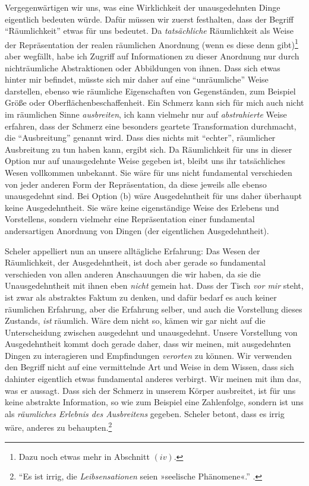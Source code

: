 \documentclass[a4paper, 12pt]{article}
\begin{document}
\begin{onehalfspace}
Vergegenwärtigen wir uns, was eine Wirklichkeit der unausgedehnten Dinge eigentlich bedeuten würde. Dafür müssen wir zuerst festhalten, dass der Begriff "`Räumlichkeit"' etwas für uns bedeutet. Da \emph{tatsächliche} Räumlichkeit als Weise der Repräsentation der realen räumlichen Anordnung (wenn es diese denn gibt)\footnote{Dazu noch etwas mehr in Abschnitt $(iv)$.} aber wegfällt, habe ich Zugriff auf Informationen zu dieser Anordnung nur durch nichträumliche Abstraktionen oder Abbildungen von ihnen. Dass sich etwas hinter mir befindet, müsste sich mir daher auf eine "`unräumliche"' Weise darstellen, ebenso wie räumliche Eigenschaften von Gegenständen, zum Beispiel Größe oder Oberflächen\-be\-schaf\-fenheit. Ein Schmerz kann sich für mich auch nicht im räumlichen Sinne \emph{ausbreiten}, ich kann vielmehr nur auf \emph{abstrahierte} Weise erfahren, dass der Schmerz eine besonders geartete Transformation durchmacht, die "`Ausbreitung"' genannt wird. Dass dies nichts mit "`echter"', räumlicher Ausbreitung zu tun haben kann, ergibt sich. Da Räumlichkeit für uns in dieser Option nur auf unausgedehnte Weise gegeben ist, bleibt uns ihr tatsächliches Wesen vollkommen unbekannt. Sie wäre für uns nicht fundamental verschieden von jeder anderen Form der Repräsentation, da diese jeweils alle ebenso unausgedehnt sind. Bei Option (b) wäre Ausgedehntheit für uns daher überhaupt keine Ausgedehntheit. Sie wäre keine eigenständige Weise des Erlebens und Vorstellens, sondern vielmehr eine Repräsentation einer fundamental andersartigen Anordnung von Dingen (der eigentlichen Ausgedehntheit).

Scheler appelliert nun an unsere alltägliche Erfahrung: Das Wesen der Räumlichkeit, der Ausgedehntheit, ist doch aber gerade so fundamental verschieden von allen anderen Anschauungen die wir haben, da sie die Unausgedehntheit mit ihnen eben \emph{nicht} gemein hat. Dass der Tisch \emph{vor mir} steht, ist zwar als abstraktes Faktum zu denken, und dafür bedarf es auch keiner räumlichen Erfahrung, aber die Erfahrung selber, und auch die Vorstellung dieses Zustands, \emph{ist} räumlich. Wäre dem nicht so, kämen wir gar nicht auf die Unterscheidung zwischen ausgedehnt und unausgedehnt. Unsere Vorstellung von Ausgedehntheit kommt doch gerade daher, dass wir meinen, mit ausgedehnten Dingen zu interagieren und Empfindungen \emph{verorten} zu können. Wir verwenden den Begriff nicht auf eine vermittelnde Art und Weise in dem Wissen, dass sich dahinter eigentlich etwas fundamental anderes verbirgt. Wir meinen mit ihm das, was er aussagt. Dass sich der Schmerz in unserem Körper ausbreitet, ist für uns keine abstrakte Information, so wie zum Beispiel eine Zahlenfolge, sondern ist uns als \emph{räumliches Erlebnis des Ausbreitens} gegeben. Scheler betont, dass es irrig wäre, anderes zu behaupten.\footnote{"`Es ist irrig, die \emph{Leibsensationen} seien »seelische Phänomene«."' .} 


\end{onehalfspace}
\end{document}
